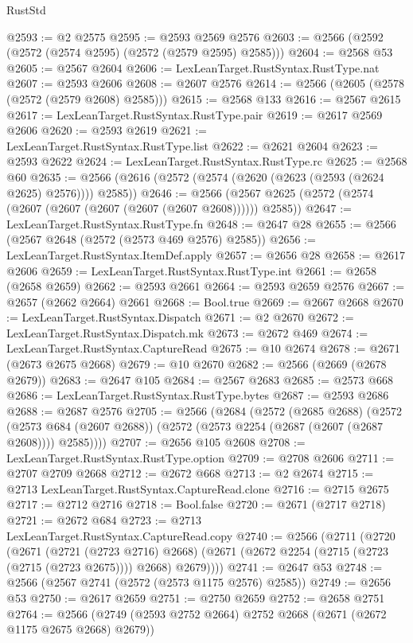 \begin{lexlean}{RustStd}
\begin{coremodule}
@2593 := @2 @2575
@2595 := @2593 @2569 @2576
@2603 := @2566 (@2592 (@2572 (@2574 @2595) (@2572 (@2579 @2595) @2585)))
@2604 := @2568 @53
@2605 := @2567 @2604
@2606 := LexLeanTarget.RustSyntax.RustType.nat
@2607 := @2593 @2606
@2608 := @2607 @2576
@2614 := @2566 (@2605 (@2578 (@2572 (@2579 @2608) @2585)))
@2615 := @2568 @133
@2616 := @2567 @2615
@2617 := LexLeanTarget.RustSyntax.RustType.pair
@2619 := @2617 @2569 @2606
@2620 := @2593 @2619
@2621 := LexLeanTarget.RustSyntax.RustType.list
@2622 := @2621 @2604
@2623 := @2593 @2622
@2624 := LexLeanTarget.RustSyntax.RustType.rc
@2625 := @2568 @60
@2635 := @2566 (@2616 (@2572 (@2574 (@2620 (@2623 (@2593 (@2624 @2625) @2576)))) @2585))
@2646 := @2566 (@2567 @2625 (@2572 (@2574 (@2607 (@2607 (@2607 (@2607 (@2607 @2608)))))) @2585))
@2647 := LexLeanTarget.RustSyntax.RustType.fn
@2648 := @2647 @28
@2655 := @2566 (@2567 @2648 (@2572 (@2573 @469 @2576) @2585))
@2656 := LexLeanTarget.RustSyntax.ItemDef.apply
@2657 := @2656 @28
@2658 := @2617 @2606
@2659 := LexLeanTarget.RustSyntax.RustType.int
@2661 := @2658 (@2658 @2659)
@2662 := @2593 @2661
@2664 := @2593 @2659 @2576
@2667 := @2657 (@2662 @2664) @2661
@2668 := Bool.true
@2669 := @2667 @2668
@2670 := LexLeanTarget.RustSyntax.Dispatch
@2671 := @2 @2670
@2672 := LexLeanTarget.RustSyntax.Dispatch.mk
@2673 := @2672 @469
@2674 := LexLeanTarget.RustSyntax.CaptureRead
@2675 := @10 @2674
@2678 := @2671 (@2673 @2675 @2668)
@2679 := @10 @2670
@2682 := @2566 (@2669 (@2678 @2679))
@2683 := @2647 @105
@2684 := @2567 @2683
@2685 := @2573 @668
@2686 := LexLeanTarget.RustSyntax.RustType.bytes
@2687 := @2593 @2686
@2688 := @2687 @2576
@2705 := @2566
    (@2684
      (@2572
        (@2685 @2688)
        (@2572
          (@2573 @684 (@2607 @2688))
          (@2572 (@2573 @2254 (@2687 (@2607 (@2687 @2608)))) @2585))))
@2707 := @2656 @105 @2608
@2708 := LexLeanTarget.RustSyntax.RustType.option
@2709 := @2708 @2606
@2711 := @2707 @2709 @2668
@2712 := @2672 @668
@2713 := @2 @2674
@2715 := @2713 LexLeanTarget.RustSyntax.CaptureRead.clone
@2716 := @2715 @2675
@2717 := @2712 @2716
@2718 := Bool.false
@2720 := @2671 (@2717 @2718)
@2721 := @2672 @684
@2723 := @2713 LexLeanTarget.RustSyntax.CaptureRead.copy
@2740 := @2566
    (@2711
      (@2720
        (@2671
          (@2721 (@2723 @2716) @2668)
          (@2671 (@2672 @2254 (@2715 (@2723 (@2715 (@2723 @2675)))) @2668) @2679))))
@2741 := @2647 @53
@2748 := @2566 (@2567 @2741 (@2572 (@2573 @1175 @2576) @2585))
@2749 := @2656 @53
@2750 := @2617 @2659
@2751 := @2750 @2659
@2752 := @2658 @2751
@2764 := @2566 (@2749 (@2593 @2752 @2664) @2752 @2668 (@2671 (@2672 @1175 @2675 @2668) @2679))

\end{coremodule}
\end{lexlean}
